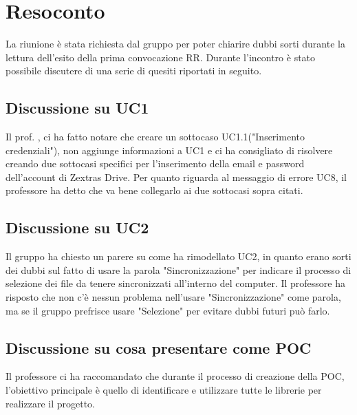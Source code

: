 \newpage


\section{Resoconto}
La riunione è stata richiesta dal gruppo \textit{\Gruppo{}} per poter chiarire dubbi sorti durante la lettura dell'esito della prima convocazione RR.
Durante l'incontro è stato possibile discutere di una serie di quesiti riportati in seguito.
\subsection{Discussione su UC1}
Il prof. \Riccardo{}, ci ha fatto notare che creare un sottocaso UC1.1("Inserimento credenziali"), non aggiunge informazioni a UC1 e ci ha consigliato di risolvere creando due sottocasi
specifici per l'inserimento della email e password dell'account di Zextras Drive.
Per quanto riguarda al messaggio di errore UC8, il professore ha detto che va bene collegarlo ai due sottocasi sopra citati.
\subsection{Discussione su UC2}
Il gruppo \textit{\Gruppo{}} ha chiesto un parere su come ha rimodellato UC2, in quanto erano sorti dei dubbi sul fatto di usare la parola "Sincronizzazione" per indicare il processo
di selezione dei file da tenere sincronizzati all'interno del computer. Il professore ha risposto che non c'è nessun problema nell'usare "Sincronizzazione" come parola, ma se il gruppo
prefrisce usare "Selezione" per evitare dubbi futuri può farlo.
\subsection{Discussione su cosa presentare come POC}
Il professore ci ha raccomandato che durante il processo di creazione della POC, l'obiettivo principale è quello di identificare e utilizzare tutte le librerie per realizzare il progetto.

\newpage

